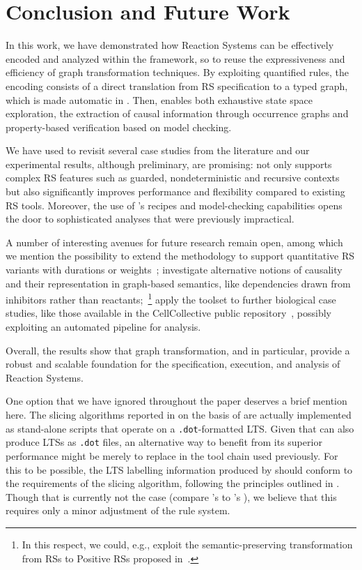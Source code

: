 
\section{Conclusion and Future Work}\label{sec:conc}

In this work, we have demonstrated how Reaction Systems can be effectively encoded and analyzed within the \GROOVE framework, so to reuse the expressiveness and efficiency of graph transformation techniques. By exploiting quantified rules, the encoding consists of a direct translation from RS specification to a typed graph, which is made automatic in \BioResolve.
Then, \GROOVE enables both exhaustive state space exploration, the extraction of causal information through occurrence graphs and property-based verification based on model checking.

We have used \GROOVE to revisit several case studies from the literature and our experimental results, although preliminary, are promising: \GROOVE not only supports complex RS features such as guarded, nondeterministic and recursive contexts but also significantly improves performance and flexibility compared to existing RS tools.
Moreover, the use of \GROOVE’s recipes and model-checking capabilities opens the door to sophisticated analyses that were previously impractical.

A number of interesting avenues for future research remain open, among which we mention the possibility to extend the methodology to support quantitative RS variants with durations or weights~\cite{DBLP:journals/nca/BrodoBFGLM23}; investigate alternative notions of causality and their representation in graph-based semantics, like dependencies drawn from inhibitors rather than reactants;~\footnote{In this respect, we could, e.g., exploit the semantic-preserving transformation from RSs to Positive RSs proposed in~\cite{DBLP:journals/sttt/BrodoBFGMMP24}.} apply the \GROOVE toolset to further biological case studies, like those available in the CellCollective public repository~\cite{helikar2012cell}, possibly exploiting an automated pipeline for analysis.

Overall, the results show that graph transformation, and \GROOVE in particular, provide a robust and scalable foundation for the specification, execution, and analysis of Reaction Systems.

\medskip\noindent One option that we have ignored throughout the paper deserves a brief mention here. The slicing algorithms reported in \cite{DBLP:conf/cmsb/BowlesBBFGM24,datamod2023} on the basis of \BioResolve are actually implemented as stand-alone scripts that operate on a \texttt{.dot}-formatted LTS. Given that \GROOVE can also produce LTSs as \texttt{.dot} files, an alternative way to benefit from its superior performance might be merely to replace \BioResolve in the tool chain used previously. For this to be possible, the LTS labelling information produced by \GROOVE should conform to the requirements of the slicing algorithm, following the principles outlined in . Though that is currently not the case (compare \GROOVE's  to \BioResolve's ), we believe that this requires only a minor adjustment of the rule system.

